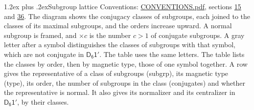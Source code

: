 \documentclass[10pt,a4paper]{article}
\makeatletter
\renewcommand\section{\@startsection{section}{1}{\z@}{-3ex plus -1ex minus -.2ex}%
  {1.2ex plus .2ex}{\normalfont\large\sffamily\bfseries\color{parttitle}}}
\numberwithin{equation}{section}
\newcommand{\grp}[1]{\mathsf{#1}}
\makeatother
\begin{document}
\section{Subgroup lattice}\label{s:subgroups}
Conventions: \href{../../CONVENTIONS.pdf}{CONVENTIONS.pdf}, sections \href{../../../rotation/CONVENTIONS.pdf\#conv.15}{15} and \href{../../CONVENTIONS.pdf\#conv.36}{36}.
The diagram shows the conjugacy classes of subgroups, each joined to the classes of its maximal subgroups, and the orders increase upward. \label{n:index.conjugates.c}\label{n:mark.conjugates}A normal subgroup is framed, and ${\times}c$ is the number $c > 1$ of conjugate subgroups. \label{n:mark.letter}A gray letter after a symbol distinguishes the classes of subgroups with that symbol, which are not conjugate in $\grp{D_{6}1'}$. The table uses the same letters. The table lists the classes by order, then by magnetic type, those of one symbol together. \label{n:head.subgroup}\label{n:head.magnetic.type}\label{n:head.order}\label{n:head.conjugates}\label{n:head.normal}A row gives the representative of a class of subgroups (subgrp), its magnetic type (type), its order, the number of subgroups in the class (conjugates) and whether the representative is normal. \label{n:head.normalizer}\label{n:head.centralizer}It also gives its normalizer and its centralizer in $\grp{D_{6}1'}$, by their classes. 
\end{document}
